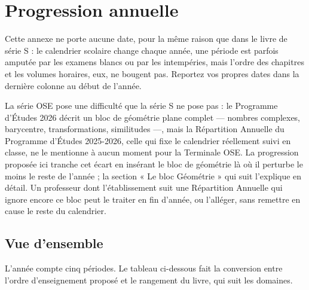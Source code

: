 \chapter{Progression annuelle}

Cette annexe ne porte aucune date, pour la même raison que dans le livre de
série S : le calendrier scolaire change chaque année, une période est
parfois amputée par les examens blancs ou par les intempéries, mais l'ordre
des chapitres et les volumes horaires, eux, ne bougent pas. Reportez vos
propres dates dans la dernière colonne au début de l'année.

La série OSE pose une difficulté que la série S ne pose pas : le Programme
d'Études 2026 décrit un bloc de géométrie plane complet — nombres complexes,
barycentre, transformations, similitudes —, mais la Répartition Annuelle du
Programme d'Études 2025-2026, celle qui fixe le calendrier réellement suivi
en classe, ne le mentionne à aucun moment pour la Terminale OSE. La
progression proposée ici tranche cet écart en insérant le bloc de géométrie
là où il perturbe le moins le reste de l'année ; la section « Le bloc
Géométrie » qui suit l'explique en détail. Un professeur dont l'établissement
suit une Répartition Annuelle qui ignore encore ce bloc peut le traiter en
fin d'année, ou l'alléger, sans remettre en cause le reste du calendrier.

\section*{Vue d'ensemble}

L'année compte cinq périodes. Le tableau ci-dessous fait la conversion entre
l'ordre d'enseignement proposé et le rangement du livre, qui suit les
domaines.

